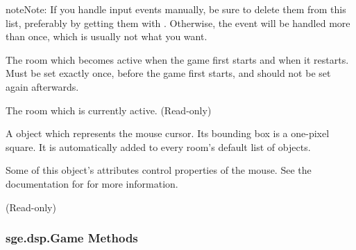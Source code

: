 \documentclass[letterpaper,10pt,english]{sphinxmanual}
\begin{document}
\begin{fulllineitems}
\begin{fulllineitems}
\begin{notice}{note}{Note:}
If you handle input events manually, be sure to delete them
from this list, preferably by getting them with
.  Otherwise, the event will be handled more
than once, which is usually not what you want.
\end{notice}

\end{fulllineitems}


\begin{fulllineitems}
\label{dsp:sge.dsp.Game.start_room}
The room which becomes active when the game first starts and when
it restarts.  Must be set exactly once, before the game first
starts, and should not be set again afterwards.

\end{fulllineitems}


\begin{fulllineitems}
\label{dsp:sge.dsp.Game.current_room}
The room which is currently active.  (Read-only)

\end{fulllineitems}


\begin{fulllineitems}
\label{dsp:sge.dsp.Game.mouse}
A {\hyperref[dsp:sge.dsp.Object]{\emph{}}} object which represents the mouse
cursor.  Its bounding box is a one-pixel square.  It is
automatically added to every room's default list of objects.

Some of this object's attributes control properties of the mouse.
See the documentation for {\hyperref[mouse:module\string-sge.mouse]{\emph{}}} for more information.

(Read-only)

\end{fulllineitems}


\end{fulllineitems}



\subsubsection{sge.dsp.Game Methods}
\label{dsp:sge-dsp-game-methods}
\end{document}
